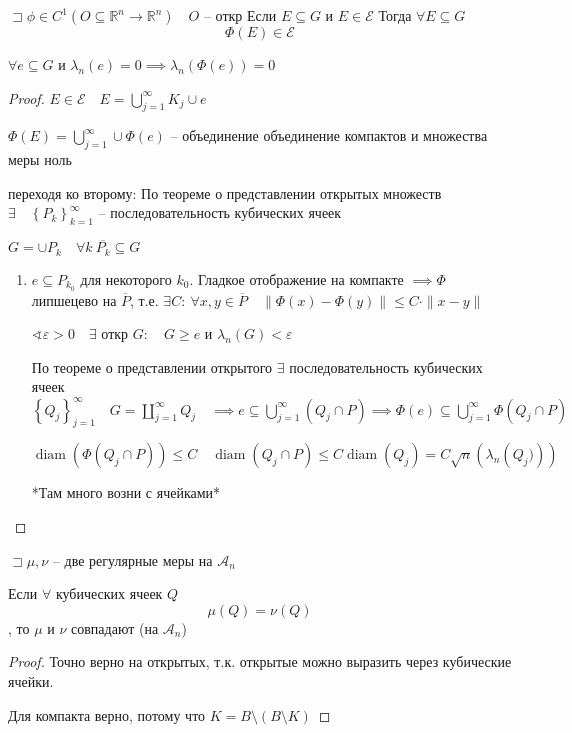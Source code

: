 \documentclass{book}
\newcommand\R{\ensuremath{\mathbb{R}}}
\theoremstyle{definition}
\DeclareMathOperator{\diam}{diam}
\begin{document}
\begin{theorem}

    $\sqsupset  \phi\in C^1\left( O\subseteq \R^n \to \R^n \right)\quad O$ -- откр   Если $E\subseteq G \text{ и } E \in \mathcal E$ Тогда $\forall E \subseteq G$ \[\Phi(E)\in \mathcal E\]

    $\forall e\subseteq G$ и $\lambda_n(e) = 0 \implies \lambda_n\left( \Phi\left( e \right)  \right) =0$
\end{theorem}
\begin{proof}
    $E\in \mathcal E\quad E = \bigcup\limits_{j=1}^{\infty }K_j \cup e $ 

    $\Phi(E) = \bigcup\limits_{j=1}^{\infty } \cup \Phi(e) $  -- объединение объединение компактов и множества меры ноль

    переходя ко второму: По теореме о представлении открытых множеств $\exists \quad \left\{ P_k \right\} _{k=1}^{\infty }$ -- последовательность кубических ячеек

    $G = \cup P_k\quad \forall k\ \overline{P_k}\subseteq G$

    \begin{enumerate}
        \item $e\subseteq P_{k_0}$ для некоторого $k_0$. Гладкое отображение на компакте $\implies \Phi$ липшецево на $\overline{P}$, т.е.  $\exists C:\ \forall x, y\in \overline{P}\quad \|\Phi(x) - \Phi(y)\|\leqslant C\cdot \|x-y\|$

            $\sphericalangle \varepsilon >0\quad \exists $ откр $G:\quad G \geqslant e$ и $\lambda_n(G) <\varepsilon$

            По теореме о представлении открытого $\exists $ последовательность кубических ячеек  $\left\{ Q_j \right\} _{j=1}^{\infty }\quad G = \coprod_{j=1}^{\infty }Q_j\quad  \implies e\subseteq \bigcup\limits_{j=1}^{\infty }\left( Q_j\cap P \right) \implies \Phi(e) \subseteq \bigcup\limits_{j=1}^{\infty }\Phi\left( Q_j \cap P \right) $ 

            $\diam\left( \Phi\left( Q_j\cap P \right)  \right) \leqslant C\quad \diam \left( Q_j \cap P \right) \leqslant C\diam\left( Q_j \right) =C\sqrt{n} \left( \lambda_n\left( Q_j) \right)  \right) $

             *Там много возни с ячейками*
    \end{enumerate}
\end{proof}

\begin{lemma}

    $\sqsupset \mu, \nu$ -- две регулярные меры на $\mathcal A_n$

    Если $\forall $ кубических ячеек $Q$ \[\mu(Q) = \nu(Q)\], то  $\mu$ и  $\nu$ совпадают (на $\mathcal A_n$)
\end{lemma}
\begin{proof}
    Точно верно на открытых, т.к. открытые можно выразить через кубические ячейки.

    Для компакта верно, потому что $K = B \setminus  \left(B\setminus K  \right) $
\end{proof}
\end{document}
